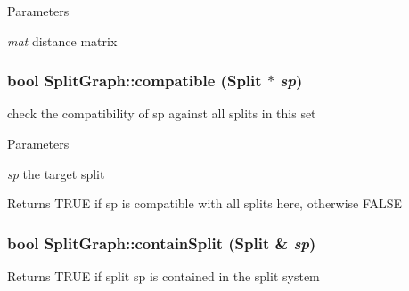 \begin{DoxyParams}{Parameters}
\item[{\em mat}]distance matrix \end{DoxyParams}
\hypertarget{classSplitGraph_acaa3948107ecf6717cd11cd57829587e}{
\subsubsection[{compatible}]{\setlength{\rightskip}{0pt plus 5cm}bool SplitGraph::compatible ({\bf Split} $\ast$ {\em sp})}}
\label{classSplitGraph_acaa3948107ecf6717cd11cd57829587e}
check the compatibility of sp against all splits in this set 
\begin{DoxyParams}{Parameters}
\item[{\em sp}]the target split \end{DoxyParams}
\begin{DoxyReturn}{Returns}
TRUE if sp is compatible with all splits here, otherwise FALSE 
\end{DoxyReturn}
\hypertarget{classSplitGraph_a43b37646702074556d3c7c894dbee9ca}{
\subsubsection[{containSplit}]{\setlength{\rightskip}{0pt plus 5cm}bool SplitGraph::containSplit ({\bf Split} \& {\em sp})}}
\label{classSplitGraph_a43b37646702074556d3c7c894dbee9ca}
\begin{DoxyReturn}{Returns}
TRUE if split sp is contained in the split system 
\end{DoxyReturn}

